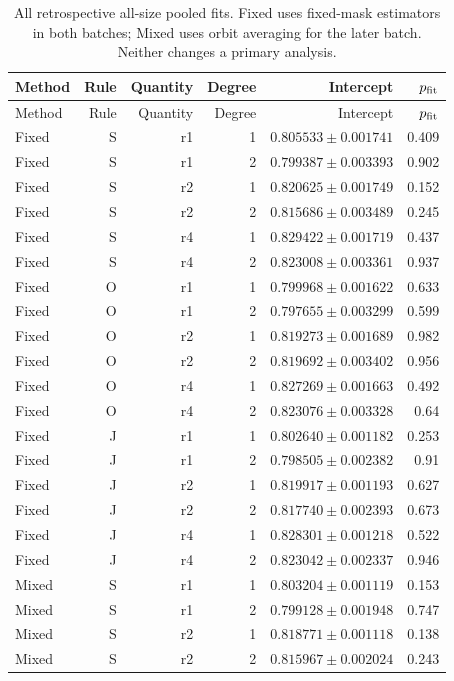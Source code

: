 {\small\setlength{\tabcolsep}{3.5pt}
\begin{longtable}{lrrrrr}
\caption{All retrospective all-size pooled fits. Fixed uses fixed-mask estimators in both batches; Mixed uses orbit averaging for the later batch. Neither changes a primary analysis.}\\
\toprule
Method & Rule & Quantity & Degree & Intercept & $p_{\rm fit}$\\
\midrule
\endfirsthead
\toprule
Method & Rule & Quantity & Degree & Intercept & $p_{\rm fit}$\\
\midrule
\endhead
\bottomrule\endfoot
Fixed & S & r1 & 1 & $0.805533\pm0.001741$ & 0.409\\
Fixed & S & r1 & 2 & $0.799387\pm0.003393$ & 0.902\\
Fixed & S & r2 & 1 & $0.820625\pm0.001749$ & 0.152\\
Fixed & S & r2 & 2 & $0.815686\pm0.003489$ & 0.245\\
Fixed & S & r4 & 1 & $0.829422\pm0.001719$ & 0.437\\
Fixed & S & r4 & 2 & $0.823008\pm0.003361$ & 0.937\\
Fixed & O & r1 & 1 & $0.799968\pm0.001622$ & 0.633\\
Fixed & O & r1 & 2 & $0.797655\pm0.003299$ & 0.599\\
Fixed & O & r2 & 1 & $0.819273\pm0.001689$ & 0.982\\
Fixed & O & r2 & 2 & $0.819692\pm0.003402$ & 0.956\\
Fixed & O & r4 & 1 & $0.827269\pm0.001663$ & 0.492\\
Fixed & O & r4 & 2 & $0.823076\pm0.003328$ & 0.64\\
Fixed & J & r1 & 1 & $0.802640\pm0.001182$ & 0.253\\
Fixed & J & r1 & 2 & $0.798505\pm0.002382$ & 0.91\\
Fixed & J & r2 & 1 & $0.819917\pm0.001193$ & 0.627\\
Fixed & J & r2 & 2 & $0.817740\pm0.002393$ & 0.673\\
Fixed & J & r4 & 1 & $0.828301\pm0.001218$ & 0.522\\
Fixed & J & r4 & 2 & $0.823042\pm0.002337$ & 0.946\\
Mixed & S & r1 & 1 & $0.803204\pm0.001119$ & 0.153\\
Mixed & S & r1 & 2 & $0.799128\pm0.001948$ & 0.747\\
Mixed & S & r2 & 1 & $0.818771\pm0.001118$ & 0.138\\
Mixed & S & r2 & 2 & $0.815967\pm0.002024$ & 0.243\\

\end{longtable}}
